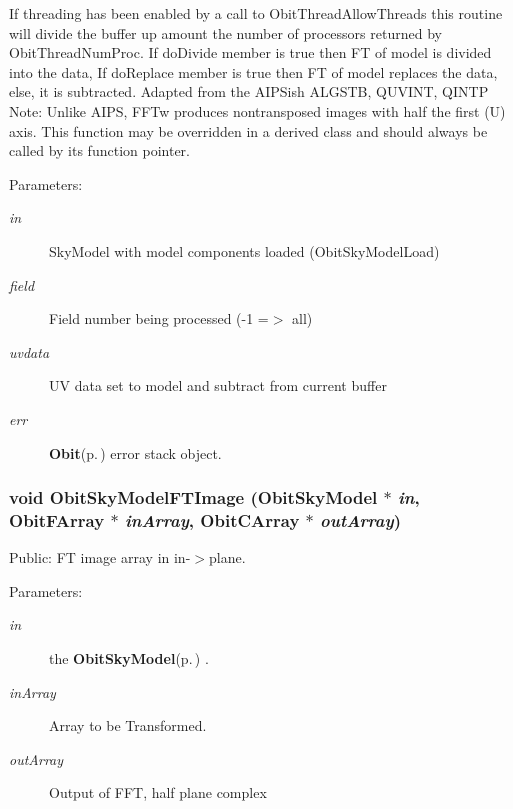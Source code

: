 If threading has been enabled by a call to Obit\-Thread\-Allow\-Threads this routine will divide the buffer up amount the number of processors returned by Obit\-Thread\-Num\-Proc. If do\-Divide member is true then FT of model is divided into the data, If do\-Replace member is true then FT of model replaces the data, else, it is subtracted. Adapted from the AIPSish ALGSTB, QUVINT, QINTP Note: Unlike AIPS, FFTw produces nontransposed images with half the first (U) axis. This function may be overridden in a derived class and should always be called by its function pointer. \begin{Desc}
\item[Parameters:]
\begin{description}
\item[{\em in}]Sky\-Model with model components loaded (Obit\-Sky\-Model\-Load) \item[{\em field}]Field number being processed (-1 =$>$ all) \item[{\em uvdata}]UV data set to model and subtract from current buffer \item[{\em err}]{\bf Obit}{\rm (p.\,\pageref{structObit})} error stack object. \end{description}
\end{Desc}
\subsubsection{\setlength{\rightskip}{0pt plus 5cm}void Obit\-Sky\-Model\-FTImage ({\bf Obit\-Sky\-Model} $\ast$ {\em in}, {\bf Obit\-FArray} $\ast$ {\em in\-Array}, {\bf Obit\-CArray} $\ast$ {\em out\-Array})}\label{ObitSkyModel_8h_a77}


Public: FT image array in in-$>$plane. 

\begin{Desc}
\item[Parameters:]
\begin{description}
\item[{\em in}]the {\bf Obit\-Sky\-Model}{\rm (p.\,\pageref{structObitSkyModel})} . \item[{\em in\-Array}]Array to be Transformed. \item[{\em out\-Array}]Output of FFT, half plane complex \end{description}
\end{Desc}
